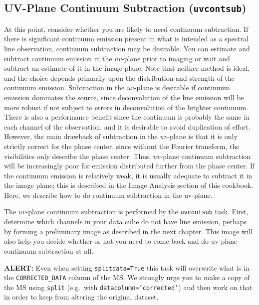 \subsection{UV-Plane Continuum Subtraction ({\tt uvcontsub})}
\label{section:cal.other.uvcontsub}

At this point, consider whether you are likely to need continuum
subtraction.  If there is significant continuum emission present in
what is intended as a spectral line observation, continuum subtraction
may be desirable.  You can estimate and subtract continuum emission in
the $uv$-plane prior to imaging or wait and subtract an estimate of it
in the image-plane.  Note that neither method is ideal, and the choice
depends primarily upon the distribution and strength of the continuum
emission.  Subtraction in the $uv$-plane is desirable if continuum
emission dominates the source, since deconvolution of the line
emission will be more robust if not subject to errors in deconvolution
of the brighter continuum.  There is also a performance benefit since
the continuum is probably the same in each channel of the observation,
and it is desirable to avoid duplication of effort.  However, the main
drawback of subtraction in the $uv$-plane is that it is only strictly
correct for the phase center, since without the Fourier transform, the
visibilities only describe the phase center.  Thus, $uv$-plane continuum
subtraction will be increasingly poor for emission distributed further
from the phase center.  If the continuum emission is relatively weak,
it is usually adequate to subtract it in the image plane; this is
described in the Image Analysis section of this cookbook.  Here, we
describe how to do continuum subtraction in the uv-plane.

The $uv$-plane continuum subtraction is performed by the {\tt uvcontsub} task.
First, determine which channels in your data cube do not have line
emission, perhaps by forming a preliminary image as described in the
next chapter.  This image will also help you decide whether or not you
need to come back and do uv-plane continuum subtraction at all.

{\bf ALERT:} Even when setting {\tt splitdata=True} this task will
overwrite what is in the {\tt CORRECTED\_DATA} column of the MS.  We
strongly urge you to make a copy of the MS using {\tt split} (e.g.\ 
with {\tt datacolumn='corrected'}) and then work on that in order to
keep from altering the original dataset.

